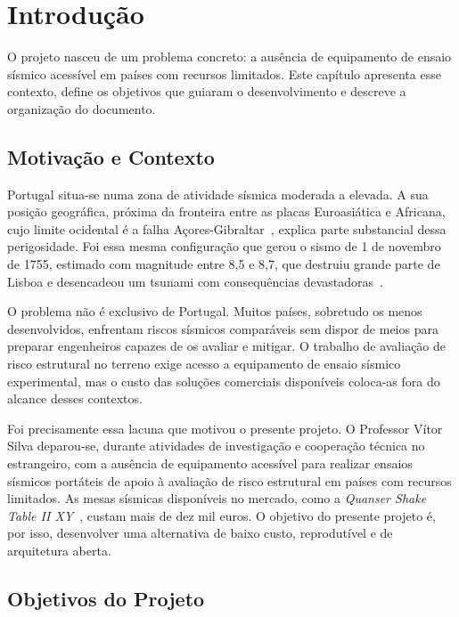 

\chapter{Introdução}
\label{chapter:introduction}

\begin{introduction}
O projeto nasceu de um problema concreto: a ausência de equipamento de ensaio sísmico acessível em países com recursos limitados. Este capítulo apresenta esse contexto, define os objetivos que guiaram o desenvolvimento e descreve a organização do documento.
\end{introduction}

\section{Motivação e Contexto}
\label{sec:motivacao}

Portugal situa-se numa zona de atividade sísmica moderada a elevada. A sua posição geográfica, próxima da fronteira entre as placas Euroasiática e Africana, cujo limite ocidental é a falha Açores-Gibraltar~\cite{Borges2001}, explica parte substancial dessa perigosidade. Foi essa mesma configuração que gerou o sismo de 1 de novembro de 1755, estimado com magnitude entre 8,5 e 8,7, que destruiu grande parte de Lisboa e desencadeou um tsunami com consequências devastadoras~\cite{Baptista1998}.

O problema não é exclusivo de Portugal. Muitos países, sobretudo os menos desenvolvidos, enfrentam riscos sísmicos comparáveis sem dispor de meios para preparar engenheiros capazes de os avaliar e mitigar. O trabalho de avaliação de risco estrutural no terreno exige acesso a equipamento de ensaio sísmico experimental, mas o custo das soluções comerciais disponíveis coloca-as fora do alcance desses contextos.

Foi precisamente essa lacuna que motivou o presente projeto. O Professor Vítor Silva deparou-se, durante atividades de investigação e cooperação técnica no estrangeiro, com a ausência de equipamento acessível para realizar ensaios sísmicos portáteis de apoio à avaliação de risco estrutural em países com recursos limitados. As mesas sísmicas disponíveis no mercado, como a \textit{Quanser Shake Table II XY}~\cite{QuanserShakeTableIIXY}, custam mais de dez mil euros. O objetivo do presente projeto é, por isso, desenvolver uma alternativa de baixo custo, reprodutível e de arquitetura aberta.

\section{Objetivos do Projeto}
\label{sec:objetivos}

